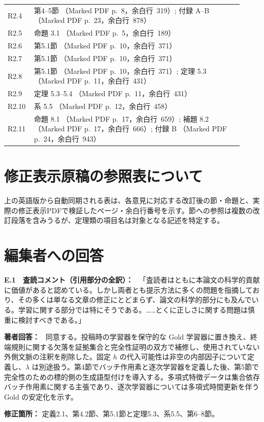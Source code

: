 \documentclass[10pt,a4paper]{ltjsarticle}
\newcommand{\Comment}[1]{\par\medskip\noindent\textbf{#1　査読コメント（引用部分の全訳）：}\ }
\newcommand{\Reply}{\par\noindent\textbf{著者回答：}\ }
\newcommand{\Location}[1]{\par\noindent\textbf{修正箇所：} #1\par}
\begin{document}
\begin{longtable}{@{}p{0.09\linewidth}p{0.83\linewidth}@{}}
R2.4 & 第4--5節 （Marked PDF p.~8，余白行~319）; 付録 A--B （Marked PDF p.~23，余白行~878）\\
R2.5 & 命題 3.1 （Marked PDF p.~5，余白行~189）\\
R2.6 & 第5.1節 （Marked PDF p.~10，余白行~371）\\
R2.7 & 第5.1節 （Marked PDF p.~10，余白行~371）\\
R2.8 & 第5.1節 （Marked PDF p.~10，余白行~371）; 定理 5.3 （Marked PDF p.~11，余白行~431）\\
R2.9 & 定理 5.3--5.4 （Marked PDF p.~11，余白行~431）\\
R2.10 & 系 5.5 （Marked PDF p.~12，余白行~458）\\
R2.11 & 命題 8.1 （Marked PDF p.~17，余白行~659）; 補題 8.2 （Marked PDF p.~17，余白行~666）; 付録 B （Marked PDF p.~24，余白行~943）\\
\bottomrule
\end{longtable}
\endgroup




\section*{修正表示原稿の参照表について}
上の英語版から自動同期される表は、各意見に対応する改訂後の節・命題と、実際の修正表示PDFで検証したページ・余白行番号を示す。節への参照は複数の改訂段落を含みうるが、定理類の項目名は対象となる記述を特定する。

\section*{編集者への回答}
\Comment{E.1}
「査読者はともに本論文の科学的貢献に価値があると認めている。しかし両者とも提示方法に多くの問題を指摘しており、その多くは単なる文章の修正にとどまらず、論文の科学的部分にも及んでいる。学習に関する部分では特にそうである。……とくに正しさに関する問題は慎重に検討すべきである。」

\Reply
同意する。投稿時の学習器を保守的な Gold 学習器に置き換え、終端規則に関する欠落を証拠集合と完全性証明の双方で補修し、使用されていない外側文脈の注釈を削除した。固定 $h$ の代入可能性は非空の内部因子について定義し、$\lambda$ は別途扱う。第4節でバッチ作用素と逐次学習器を定義した後、第5節で完全性のための標的側の生成語型付けを導入する。多項式特徴データは集合依存バッチ作用素に関する主張であり、逐次学習器については多項式時間更新を伴う Gold の安定化を示す。
\Location{定義2.1、第4.2節、第5.1節と定理5.3、系5.5、第6--8節。}
\end{document}
